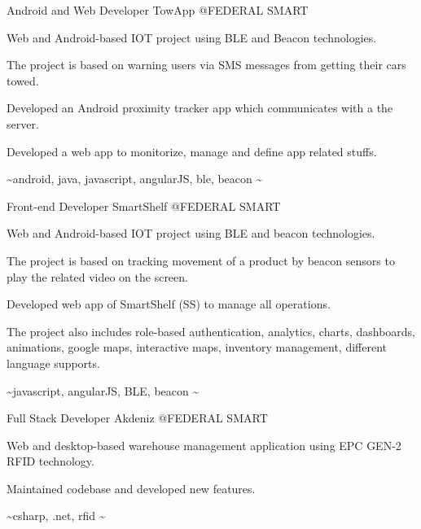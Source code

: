 \begin{cventries}
  \cventry
    {Android and Web Developer} %
    {TowApp} %
    {@FEDERAL SMART} %
    {}
    {
      \begin{cvitems} %
        \item {Web and Android-based IOT project using BLE and Beacon technologies.}
        \item {The project is based on warning users via SMS messages from getting their cars towed.}
        \item {Developed an Android proximity tracker app which communicates with a the server.}
        \item {Developed a web app to monitorize, manage and define app related stuffs.}
        \item {\textasciitilde android, java, javascript, angularJS, ble, beacon \textasciitilde}
      \end{cvitems}
    }

  \cventry
    {Front-end Developer} %
    {SmartShelf} %
    {@FEDERAL SMART} %
    {}
    {
      \begin{cvitems} %
        \item {Web and Android-based IOT project using BLE and beacon technologies.}
        \item {The project is based on tracking movement of a product by beacon sensors to play the related video on the screen.}
        \item {Developed web app of SmartShelf (SS) to manage all operations.}
        \item {The project also includes role-based authentication, analytics, charts, dashboards, animations, google maps, interactive maps, inventory management, different language supports.}
        \item {\textasciitilde javascript, angularJS, BLE, beacon \textasciitilde}
      \end{cvitems}
    }

  \cventry
    {Full Stack Developer} %
    {Akdeniz} %
    {@FEDERAL SMART} %
    {}
    {
      \begin{cvitems} %
        \item {Web and desktop-based warehouse management application using EPC GEN-2 RFID technology.}
        \item {Maintained codebase and developed new features.}
        \item {\textasciitilde csharp, .net, rfid \textasciitilde}
      \end{cvitems}
    }


\end{cventries}

